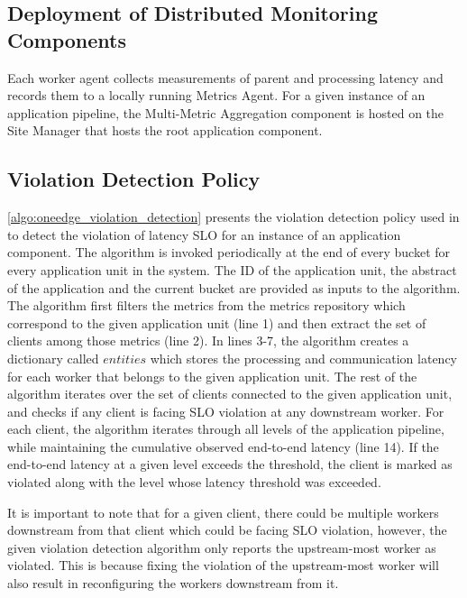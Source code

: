 \subsection{Deployment of Distributed Monitoring Components}
Each worker agent collects measurements of parent and processing latency and records them to a locally running Metrics Agent. For a given instance of an application pipeline, the Multi-Metric Aggregation component is hosted on the Site Manager that hosts the root application component.

\subsection{Violation Detection Policy}
\cref{algo:oneedge_violation_detection} presents the violation detection policy used in \oneedge{} to detect the violation of latency SLO for an instance of an application component. The algorithm is invoked periodically at the end of every bucket for every application unit in the system. The ID of the application unit, the abstract of the application and the current bucket are provided as inputs to the algorithm. The algorithm first filters the metrics from the metrics repository which correspond to the given application unit (line 1) and then extract the set of clients among those metrics (line 2). In lines 3-7, the algorithm creates a dictionary called $entities$ which stores the processing and communication latency for each worker that belongs to the given application unit. The rest of the algorithm iterates over the set of clients connected to the given application unit, and checks if any client is facing SLO violation at any downstream worker. For each client, the algorithm iterates through all levels of the application pipeline, while maintaining the cumulative observed end-to-end latency (line 14). If the end-to-end latency at a given level exceeds the threshold, the client is marked as violated along with the level whose latency threshold was exceeded.
\par It is important to note that for a given client, there could be multiple workers downstream from that client which could be facing SLO violation, however, the given violation detection algorithm only reports the upstream-most worker as violated. This is because fixing the violation of the upstream-most worker will also result in reconfiguring the workers downstream from it.
